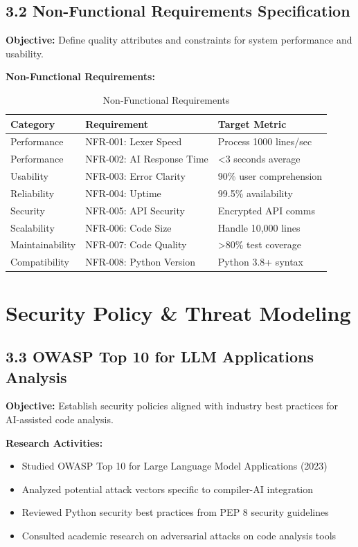 \documentclass[a4paper,11pt]{article}
\begin{document}
\subsection{3.2 Non-Functional Requirements Specification}

\textbf{Objective:} Define quality attributes and constraints for system performance and usability.

\textbf{Non-Functional Requirements:}

\begin{table}[h]
\centering
\begin{tabularx}{\textwidth}{|l|X|l|}
\hline
\rowcolor{blue!10}
\textbf{Category} & \textbf{Requirement} & \textbf{Target Metric} \\
\hline
Performance & NFR-001: Lexer Speed & Process 1000 lines/sec \\
\hline
Performance & NFR-002: AI Response Time & <3 seconds average \\
\hline
Usability & NFR-003: Error Clarity & 90\% user comprehension \\
\hline
Reliability & NFR-004: Uptime & 99.5\% availability \\
\hline
Security & NFR-005: API Security & Encrypted API comms \\
\hline
Scalability & NFR-006: Code Size & Handle 10,000 lines \\
\hline
Maintainability & NFR-007: Code Quality & >80\% test coverage \\
\hline
Compatibility & NFR-008: Python Version & Python 3.8+ syntax \\
\hline
\end{tabularx}
\caption{Non-Functional Requirements}
\end{table}

\newpage

\section{Security Policy \& Threat Modeling}

\subsection{3.3 OWASP Top 10 for LLM Applications Analysis}

\textbf{Objective:} Establish security policies aligned with industry best practices for AI-assisted code analysis.

\textbf{Research Activities:}
\begin{itemize}[leftmargin=*]
    \item Studied OWASP Top 10 for Large Language Model Applications (2023)
    \item Analyzed potential attack vectors specific to compiler-AI integration
    \item Reviewed Python security best practices from PEP 8 security guidelines
    \item Consulted academic research on adversarial attacks on code analysis tools
\end{itemize}
\end{document}
